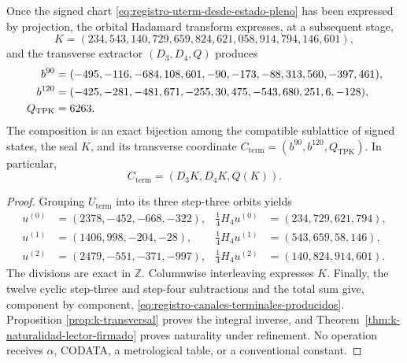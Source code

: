 \begin{theorem}
\label{thm:registro-evaluacion-terminal-recuperada}
Once the signed chart \eqref{eq:registro-uterm-desde-estado-pleno} has been
expressed by projection, the orbital Hadamard transform expresses, at a
subsequent stage,
\[
 K=(234,543,140,729,659,824,621,058,914,794,146,601),
\]
and the transverse extractor \((D_3,D_4,Q)\) produces
\begin{align}
 b^{90}={}&(-495,-116,-684,108,601,-90,
             -173,-88,313,560,-397,461),\notag\\
 b^{120}={}&(-425,-281,-481,671,-255,30,
              475,-543,680,251,6,-128),\notag\\
 Q_{\mathrm{TPK}}={}&6263.
 \label{eq:registro-canales-terminales-producidos}
\end{align}
The composition is an exact bijection among the compatible sublattice of signed
states, the seal \(K\), and its transverse coordinate
\(C_{\mathrm{term}}=(b^{90},b^{120},Q_{\mathrm{TPK}})\).
In particular,
\begin{equation}
 C_{\mathrm{term}}=(D_3K,D_4K,Q(K)).
 \label{eq:registro-cterm-desde-xterm}
\end{equation}
\end{theorem}

\begin{proof}
Grouping \(U_{\mathrm{term}}\) into its three step-three orbits yields
\[
 \begin{aligned}
  u^{(0)}&=(2378,-452,-668,-322),&
  \tfrac14H_4u^{(0)}&=(234,729,621,794),\\
  u^{(1)}&=(1406,998,-204,-28),&
  \tfrac14H_4u^{(1)}&=(543,659,58,146),\\
  u^{(2)}&=(2479,-551,-371,-997),&
  \tfrac14H_4u^{(2)}&=(140,824,914,601).
 \end{aligned}
\]
The divisions are exact in \(\mathbb Z\).
Columnwise interleaving expresses \(K\). Finally, the twelve cyclic
step-three and step-four subtractions and the total sum give, component by
component, \eqref{eq:registro-canales-terminales-producidos}. Proposition
\ref{prop:k-transversal} proves the integral inverse, and
Theorem~\ref{thm:k-naturalidad-lector-firmado} proves naturality under
refinement. No operation receives \(\alpha\), CODATA, a metrological table,
or a conventional constant.
\end{proof}

